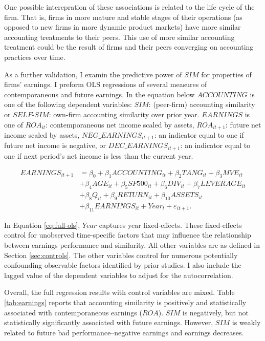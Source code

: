 \documentclass[thesis]{thesis-umich}
\begin{document}
One possible interepration of these associations is related to the life cycle of the firm. That is, firms in more mature and stable stages of their operations (as opposed to new firms in more dynamic product markets) have more similar accounting treatments to their peers. This use of more similar accounting treatment could be the result of firms and their peers converging on accounting practices over time.

As a further validation, I examin the predictive power of $SIM$ for properties of firms' earnings. I preform OLS regressions of several measures of contemporaneous and future earnings. In the equation below $ACCOUNTING$ is one of the following dependent variables: $SIM$: (peer-firm) accounting similarity or $SELF\text{-}SIM$: own-firm accounting similarity over prior year. $EARNINGS$ is one of $ROA_{it}$: contemporaneous net income scaled by assets, $ROA_{it+1}$: future net income scaled by assets, $NEG\_EARNINGS_{it+1}$: an indicator equal to one if future net income is negative, or $DEC\_EARNINGS_{it+1}$: an indicator equal to one if next period's net income is less than the current year.

\begin{equation} \label{eq:full-ols} 
\begin{aligned} 
EARNINGS_{it+1} &=
\beta_{0} + \beta_{1}ACCOUNTING_{it} + \beta_{2}TANG_{it} + \beta_{3}MVE_{it} \\&
+ \beta_{4}AGE_{it} + \beta_{5}SP500_{it} + \beta_{6}DIV_{it} + \beta_{7}LEVERAGE_{it} \\&
+ \beta_{8}Q_{it} + \beta_{9}RETURN_{it} + \beta_{10}ASSETS_{it} \\&
+ \beta_{11}EARNINGS_{it} + Year_{t} + \varepsilon_{it+1}. 
\end{aligned}
\end{equation}

In Equation \ref{eq:full-ols}, $Year$ captures year fixed-effects. These fixed-effects control for unobserved time-specific factors that may influence the relationship between earnings performance and similarity. All other variables are as defined in Section \ref{sec:controls}. The other variables control for numerous potentially confounding observable factors identified by prior studies. I also include the lagged value of the dependent variables to adjust for the autocorrelation. 

Overall, the full regression results with control variables are mixed. Table \ref{tab:earnings} reports that accounting similarity is positively and statistically associated with contemporaneous earnings ($ROA$). $SIM$ is negatively, but not statistically significantly associated with future earnings. However, $SIM$ is weakly related to future bad performance--negative earnings and earnings decreases.
\end{document}
